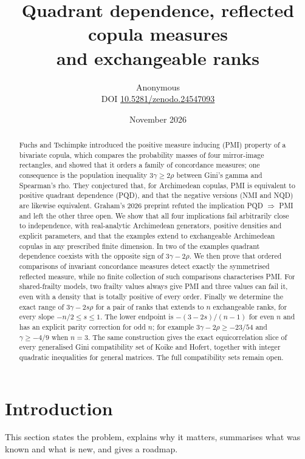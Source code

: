 \documentclass[11pt,a4paper]{article}
\title{Quadrant dependence, reflected copula measures\\ and exchangeable ranks}
\author{Anonymous\\[3pt]{\small DOI \href{https://doi.org/10.5281/zenodo.24547093}{10.5281/zenodo.24547093}}}
\date{November 2026}
\theoremstyle{remark}
\begin{document}
\maketitle

\begin{abstract}
Fuchs and Tschimpke introduced the positive measure inducing (PMI) property of a bivariate copula, which compares the probability masses of four mirror-image rectangles, and showed that it orders a family of concordance measures; one consequence is the population inequality $3\gamma\geq2\rho$ between Gini's gamma and Spearman's rho. They conjectured that, for Archimedean copulas, PMI is equivalent to positive quadrant dependence (PQD), and that the negative versions (NMI and NQD) are likewise equivalent. Graham's 2026 preprint refuted the implication PQD $\Rightarrow$ PMI and left the other three open. We show that all four implications fail arbitrarily close to independence, with real-analytic Archimedean generators, positive densities and explicit parameters, and that the examples extend to exchangeable Archimedean copulas in any prescribed finite dimension. In two of the examples quadrant dependence coexists with the opposite sign of $3\gamma-2\rho$. We then prove that ordered comparisons of invariant concordance measures detect exactly the symmetrised reflected measure, while no finite collection of such comparisons characterises PMI. For shared-frailty models, two frailty values always give PMI and three values can fail it, even with a density that is totally positive of every order. Finally we determine the exact range of $3\gamma-2s\rho$ for a pair of ranks that extends to $n$ exchangeable ranks, for every slope $-n/2\leq s\leq1$. The lower endpoint is $-(3-2s)/(n-1)$ for even $n$ and has an explicit parity correction for odd $n$; for example $3\gamma-2\rho\geq-23/54$ and $\gamma\geq-4/9$ when $n=3$. The same construction gives the exact equicorrelation slice of every generalised Gini compatibility set of Koike and Hofert, together with integer quadratic inequalities for general matrices. The full compatibility sets remain open.
\end{abstract}

\section{Introduction}\label{sec:intro}
This section states the problem, explains why it matters, summarises what was known and what is new, and gives a roadmap.
\end{document}

